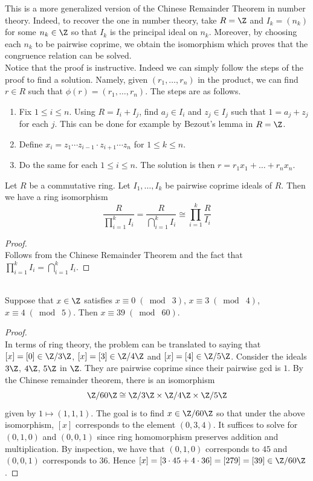 \documentclass[a4paper]{article}
\begin{document}
This is a more generalized version of the Chinese Remainder Theorem in number theory. Indeed, to recover the one in number theory, take $R=\Z$ and $I_k=(n_k)$ for some $n_k\in\Z$ so that $I_k$ is the principal ideal on $n_k$. Moreover, by choosing each $n_k$ to be pairwise coprime, we obtain the isomorphism which proves that the congruence relation can be solved. \\

Notice that the proof is instructive. Indeed we can simply follow the steps of the proof to find a solution. Namely, given $(r_1,\dots,r_n)$ in the product, we can find $r\in R$ such that $\phi(r)=(r_1,\dots,r_n)$. The steps are as follows. 
\begin{enumerate}
\item Fix $1\leq i\leq n$. Using $R=I_i+I_j$, find $a_j\in I_i$ and $z_j\in I_j$ such that $1=a_j+z_j$ for each $j$. This can be done for example by Bezout's lemma in $R=\Z$. 
\item Define $x_i=z_1\cdots z_{i-1}\cdot z_{i+1}\cdots z_n$ for $1\leq k\leq n$. 
\item Do the same for each $1\leq i\leq n$. The solution is then $r=r_1x_1+\dots+r_nx_n$. 
\end{enumerate}

\begin{crl}{}{} Let $R$ be a commutative ring. Let $I_1,\dots,I_k$ be pairwise coprime ideals of $R$. Then we have a ring isomorphism $$\frac{R}{\prod_{i=1}^kI_i}=\frac{R}{\bigcap_{i=1}^kI_i}\cong\prod_{i=1}^k\frac{R}{I_i}$$ 
\begin{proof}\\
Follows from the Chinese Remainder Theorem and the fact that $\prod_{i=1}^kI_i=\bigcap_{i=1}^kI_i$. 
\end{proof}
\end{crl}

\begin{eg}{}{}\\
Suppose that $x\in\Z$ satisfies $x\equiv 0\;(\bmod\;3)$, $x\equiv 3\;(\bmod\;4)$, $x\equiv 4\;(\bmod\;5)$. Then $x\equiv 39\;(\bmod\;60)$. 
\begin{proof}\\
In terms of ring theory, the problem can be translated to saying that $[x]=[0]\in\Z/3\Z$, $[x]=[3]\in\Z/4\Z$ and $[x]=[4]\in\Z/5\Z$. Consider the ideals $3\Z$, $4\Z$, $5\Z$ in $\Z$. They are pairwise coprime since their pairwise gcd is $1$. By the Chinese remainder theorem, there is an isomorphism $$\Z/60\Z\cong\Z/3\Z\times\Z/4\Z\times\Z/5\Z$$ given by $1\mapsto(1,1,1)$. The goal is to find $x\in\Z/60\Z$ so that under the above isomorphism, $[x]$ corresponds to the element $(0,3,4)$. It suffices to solve for $(0,1,0)$ and $(0,0,1)$ since ring homomorphism preserves addition and multiplication. By inspection, we have that $(0,1,0)$ corresponds to $45$ and $(0,0,1)$ corresponds to $36$. Hence $[x]=[3\cdot 45+4\cdot 36]=[279]=[39]\in\Z/60\Z$. 
\end{proof}
\end{eg}
\end{document}
